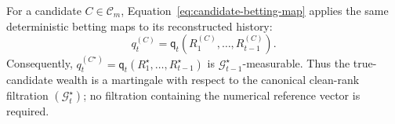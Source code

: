 For a candidate \(C\in\mathcal C_m\), Equation~\eqref{eq:candidate-betting-map} applies the same deterministic betting maps to its reconstructed history:
\begin{equation}
q_t^{(C)}
  =
  \mathsf q_t
  \!\left(
    R_1^{(C)},\ldots,R_{t-1}^{(C)}
  \right).
  \label{eq:candidate-betting-map}
\end{equation}
Consequently,
\(q_t^{(C^\star)} = \mathsf q_t(R_1^\star,\ldots,R_{t-1}^\star)\)
is \(\mathcal G_{t-1}^\star\)-measurable. Thus the true-candidate wealth is a martingale with respect to the canonical clean-rank filtration \((\mathcal G_t^\star)\); no filtration containing the numerical reference vector is required.
